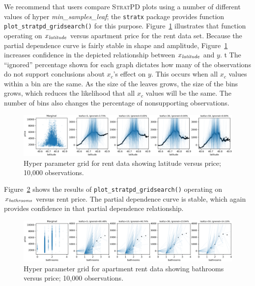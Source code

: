 \documentclass[12pt]{article}
\newcommand{\figref}[1]{Figure~\ref{#1}}
\newcommand{\spd}{\fontfamily{cmr}\textsc{\small StratPD}}
\begin{document}
We recommend that users compare \spd{} plots using a number of different values of hyper {\it min\_samples\_leaf}; the {\tt stratx} package provides function {\tt plot\_stratpd\_gridsearch()} for this purpose. \figref{fig:latitude_grid} illustrates that function operating on $x_{\it latitude}$ versus apartment price for the rent data set. Because the partial dependence curve is fairly stable in shape and amplitude, \figref{fig:latitude_grid} increases confidence in the depicted relationship between $x_{\it latitude}$ and $y$.
t
The ``ignored'' percentage shown for each graph dictates how many of the observations do not support conclusions about $x_c$'s effect on $y$. This occurs when all $x_c$ values within a bin are the same. As the size of the leaves grows, the size of the bins grows, which reduces the likelihood that all $x_c$ values will be the same.  The number of bins also changes the percentage of nonsupporting observations.

\begin{figure}[htbp]
\begin{center}
\includegraphics[scale=0.5]{images/latitude_meta.png}
\caption{Hyper parameter grid for rent data showing latitude versus price; 10,000 observations.}
\label{fig:latitude_grid}
\end{center}
\end{figure}

\figref{fig:bath_grid} shows the results of {\tt plot\_stratpd\_gridsearch()} operating on $x_{\it bathrooms}$ versus rent price. The partial dependence curve is stable, which again provides confidence in that partial dependence relationship.

\begin{figure}[htbp]
\begin{center}
\includegraphics[scale=0.5]{images/bathrooms_meta.png}
\caption{Hyper parameter grid for apartment rent data showing bathrooms versus price; 10,000 observations.}
\label{fig:bath_grid}
\end{center}
\end{figure}
\end{document}
